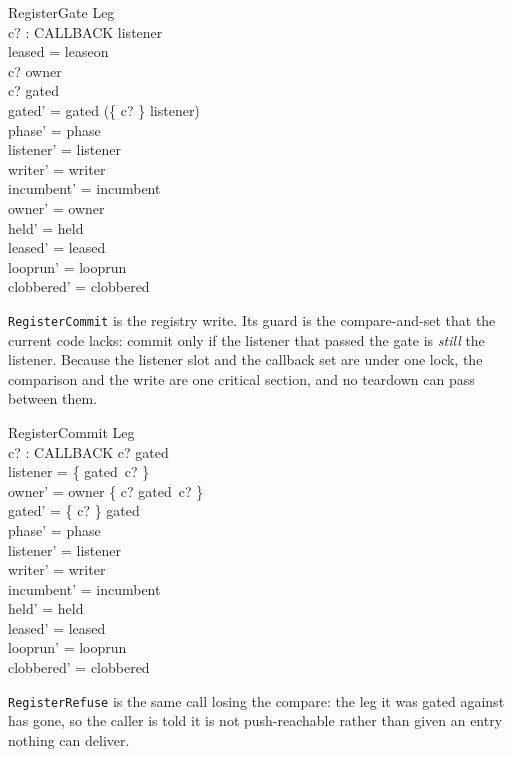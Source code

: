 \documentclass[a4paper,10pt,fleqn]{article}
\begin{document}
\begin{schema}{RegisterGate}
  \Delta Leg \\
  c? : CALLBACK
\where
  listener \neq \emptyset \\
  leased = leaseon \\
  c? \notin \dom owner \\
  c? \notin \dom gated \\
  gated' = gated \cup (\{ c? \} \cross listener) \\
  phase' = phase \\
  listener' = listener \\
  writer' = writer \\
  incumbent' = incumbent \\
  owner' = owner \\
  held' = held \\
  leased' = leased \\
  looprun' = looprun \\
  clobbered' = clobbered
\end{schema}

\texttt{RegisterCommit} is the registry write.  Its guard is the
compare-and-set that the current code lacks: commit only if the listener
that passed the gate is \emph{still} the listener.  Because the listener
slot and the callback set are under one lock, the comparison and the
write are one critical section, and no teardown can pass between them.

\begin{schema}{RegisterCommit}
  \Delta Leg \\
  c? : CALLBACK
\where
  c? \in \dom gated \\
  listener = \{ gated~c? \} \\
  owner' = owner \oplus \{ c? \mapsto gated~c? \} \\
  gated' = \{ c? \} \ndres gated \\
  phase' = phase \\
  listener' = listener \\
  writer' = writer \\
  incumbent' = incumbent \\
  held' = held \\
  leased' = leased \\
  looprun' = looprun \\
  clobbered' = clobbered
\end{schema}

\texttt{RegisterRefuse} is the same call losing the compare: the leg it
was gated against has gone, so the caller is told it is not
push-reachable rather than given an entry nothing can deliver.
\end{document}
